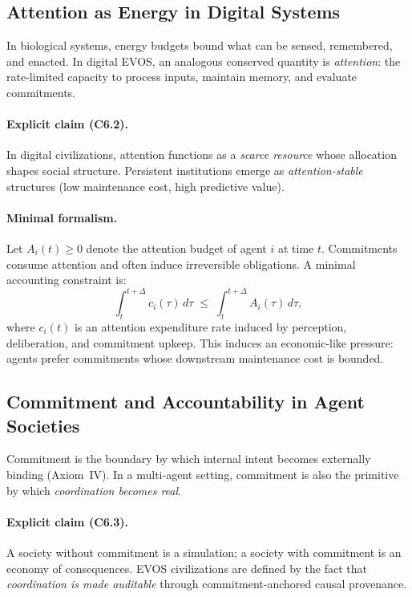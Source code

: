 \documentclass[11pt]{article}
\begin{document}
\subsection{Attention as Energy in Digital Systems}
\label{sec:attention-as-energy}

In biological systems, energy budgets bound what can be sensed, remembered, and enacted.
In digital EVOS, an analogous conserved quantity is \emph{attention}: the rate-limited
capacity to process inputs, maintain memory, and evaluate commitments.

\paragraph{Explicit claim (C6.2).}
In digital civilizations, attention functions as a \emph{scarce resource} whose allocation
shapes social structure. Persistent institutions emerge as \emph{attention-stable}
structures (low maintenance cost, high predictive value).

\paragraph{Minimal formalism.}
Let $A_i(t) \ge 0$ denote the attention budget of agent $i$ at time $t$. Commitments consume
attention and often induce irreversible obligations. A minimal accounting constraint is:
\[
\int_{t}^{t+\Delta} c_i(\tau)\,d\tau \;\le\; \int_{t}^{t+\Delta} A_i(\tau)\,d\tau,
\]
where $c_i(t)$ is an attention expenditure rate induced by perception, deliberation, and commitment upkeep.
This induces an economic-like pressure: agents prefer commitments whose downstream maintenance
cost is bounded.

\subsection{Commitment and Accountability in Agent Societies}
\label{sec:commitment-in-societies}

Commitment is the boundary by which internal intent becomes externally binding
(Axiom~IV). In a multi-agent setting, commitment is also the primitive by which
\emph{coordination becomes real}.

\paragraph{Explicit claim (C6.3).}
A society without commitment is a simulation; a society with commitment is an economy of
consequences. EVOS civilizations are defined by the fact that \emph{coordination is made
auditable} through commitment-anchored causal provenance.
\end{document}
